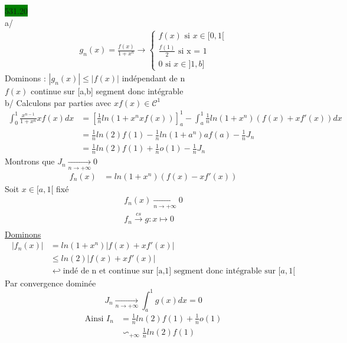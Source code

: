 \documentclass{article}
\begin{document}
\noindent \colorbox{green}{531.20}\\
a/ 
\begin{align*}
    g_{n}(x) = \frac{f(x)}{1+x^{n}} \rightarrow \begin{cases}
      f(x) \text{ si } x \in [0, 1[ \\
      \frac{f(1)}{2} \text{ si x = 1}\\
      0 \text{ si } x \in ]1, b]
    \end{cases}
\end{align*}
Dominons : \(|g_{n}(x)| \leq |f(x)|\) indépendant de n \\
\(f(x)\) continue sur [a,b] segment donc intégrable\\
b/ Calculons par parties avec \(xf(x) \in \mathcal{C}^{1}\)
\begin{align*}
  \int_{0}^{1} \frac{x^{n-1}}{1+x^{n}}x f(x) dx &= [\frac{1}{n}ln(1+x^{n}xf(x))]^{1}_{a}-\int_{a}^{1}\frac{1}{n}ln(1+x^{n})(f(x)+xf'(x))dx\\
                                                &= \frac{1}{n}ln(2)f(1) - \frac{1}{n}ln(1+a^{n})af(a)-\frac{1}{n}J_{n}\\
                                                &= \frac{1}{n}ln(2)f(1) + \frac{1}{n}o(1) -\frac{1}{n}J_{n}
\end{align*}
Montrons que \(J_{n}\xrightarrow[n \to +\infty]{} 0\)
\begin{align*}
  f_{n}(x) &= ln(1+x^{n})(f(x)-xf'(x))
\end{align*}
Soit \(x \in [a, 1[\) fixé
\begin{align*}
  f_{n}(x) \xrightarrow[n\to +\infty]{} 0\\
  f_{n} \xrightarrow[]{cs} g:x \mapsto 0
\end{align*}
\underline{Dominons}
\begin{align*}
  |f_{n}(x)| &= ln(1+x^{n})|f(x) + xf'(x)| \\
             &\leq ln(2)|f(x)+xf'(x)|\\
             &\hookleftarrow \text{indé de n et continue sur [a,1] segment donc intégrable sur } [a,1[
\end{align*}
Par convergence dominée 
\begin{equation*}
  J_{n} \xrightarrow[n \to +\infty]{} \int_{a}^{1}g(x)dx = 0
\end{equation*}
\begin{align*}
  \text{Ainsi } I_{n}&=\frac{1}{n}ln(2)f(1) + \frac{1}{n}o(1)\\
                     &\backsim_{+\infty} \frac{1}{n}ln(2)f(1)
\end{align*}
\end{document}
